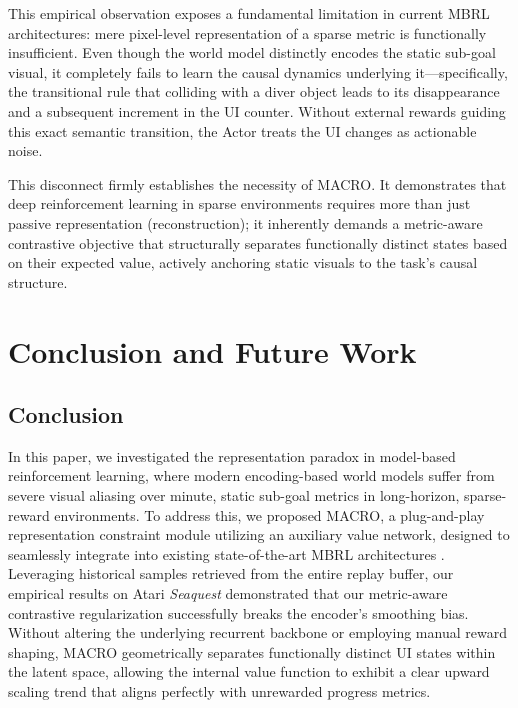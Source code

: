 \documentclass{article} %
\begin{document}
This empirical observation exposes a fundamental limitation in current MBRL architectures: mere pixel-level representation of a sparse metric is functionally insufficient. Even though the world model distinctly encodes the static sub-goal visual, it completely fails to learn the causal dynamics underlying it—specifically, the transitional rule that colliding with a diver object leads to its disappearance and a subsequent increment in the UI counter. Without external rewards guiding this exact semantic transition, the Actor treats the UI changes as actionable noise.

This disconnect firmly establishes the necessity of MACRO. It demonstrates that deep reinforcement learning in sparse environments requires more than just passive representation (reconstruction); it inherently demands a metric-aware contrastive objective that structurally separates functionally distinct states based on their expected value, actively anchoring static visuals to the task's causal structure.

\section{Conclusion and Future Work}

\subsection{Conclusion}
In this paper, we investigated the representation paradox in model-based reinforcement learning, where modern encoding-based world models suffer from severe visual aliasing over minute, static sub-goal metrics in long-horizon, sparse-reward environments. To address this, we proposed MACRO, a plug-and-play representation constraint module utilizing an auxiliary value network, designed to seamlessly integrate into existing state-of-the-art MBRL architectures \citep[e.g., DreamerV3, STORM, DRAMA;][]{hafner2025mastering, zhang2023storm, wang2025drama}. Leveraging historical samples retrieved from the entire replay buffer, our empirical results on Atari \textit{Seaquest} demonstrated that our metric-aware contrastive regularization successfully breaks the encoder's smoothing bias. Without altering the underlying recurrent backbone or employing manual reward shaping, MACRO geometrically separates functionally distinct UI states within the latent space, allowing the internal value function to exhibit a clear upward scaling trend that aligns perfectly with unrewarded progress metrics.
\end{document}
